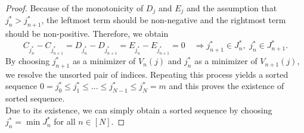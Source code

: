 \begin{proof}
Because of the monotonicity of $D_j$ and $E_j$ and the assumption that $j_n^* > j_{n+1}^*$, the leftmost term should be non-negative and the rightmost term should be non-positive. Therefore, we obtain 
\[
C_{j_n^*} - C_{j_{n+1}^*} = D_{j_n^*} - D_{j_{n+1}^*} = E_{j_n^*} - E_{j_{n+1}^*} = 0 \quad \Rightarrow j_{n+1}^* \in J_n^*, \,\, j_n^* \in J_{n+1}^*.
\]
By choosing $j_{n+1}^*$ as a minimizer of $V_n(j)$ and $j_n^*$ as a minimizer of $V_{n+1}(j)$, we resolve the unsorted pair of indices. Repeating this process yields a sorted sequence $0=j_0^* \leq j_1^* \leq ... \leq j_{N-1}^* \leq j_N^* = m$ and this proves the existence of sorted sequence.
\\
Due to its existence, we can simply obtain a sorted sequence by choosing $j_n^* = \min J_n^*$ for all $n \in [N]$.
\end{proof}



